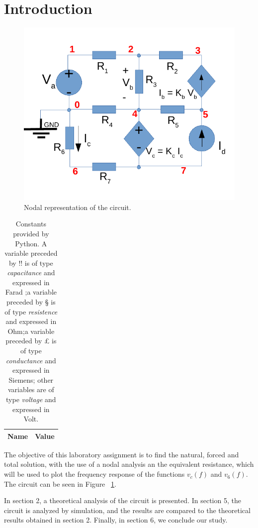 \section{Introduction}
\label{sec:introduction}

\begin{figure}[htb] \centering
\includegraphics[width=0.4\linewidth]{rcm.pdf}
\caption{Nodal representation of the circuit.}
\label{fig:rc}
\end{figure}

\begin{table}[H]
  \centering
  \begin{tabular}{|l|r|}
    \hline    
    {\bf Name} & {\bf Value} \\ \hline
    
  \end{tabular}
  \caption{Constants provided by Python. A variable  preceded by !! is of type {\it capacitance}
    and expressed in Farad ;a variable preceded by § is of type {\it resistence} and expressed in
    Ohm;a variable preceded by £ is of type {\it conductance} and expressed in
    Siemens; other variables are of type {\it voltage} and expressed in
    Volt.}
  \label{tab:op}
\end{table}

The objective of this laboratory assignment is to find the natural, forced and total solution, with the use of a nodal analysis an the equivalent resistance, which will be used to plot the frequency response of the functions $v_c(f)$ and $v_6(f)$. The circuit can be seen in Figure ~\ref{fig:rc}. 



In section 2, a theoretical analysis of the circuit is presented. In section 5, the circuit is analyzed by simulation, and the results are compared to the theoretical results obtained in section 2. Finally, in section 6, we conclude our study.


